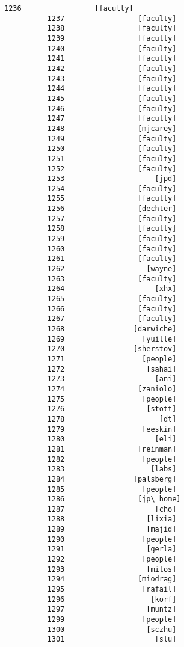 \documentclass[11pt]{article}
\begin{document}
\begin{Verbatim}[commandchars=\\\{\}]
          1236                 [faculty]
          1237                 [faculty]
          1238                 [faculty]
          1239                 [faculty]
          1240                 [faculty]
          1241                 [faculty]
          1242                 [faculty]
          1243                 [faculty]
          1244                 [faculty]
          1245                 [faculty]
          1246                 [faculty]
          1247                 [faculty]
          1248                 [mjcarey]
          1249                 [faculty]
          1250                 [faculty]
          1251                 [faculty]
          1252                 [faculty]
          1253                     [jpd]
          1254                 [faculty]
          1255                 [faculty]
          1256                 [dechter]
          1257                 [faculty]
          1258                 [faculty]
          1259                 [faculty]
          1260                 [faculty]
          1261                 [faculty]
          1262                   [wayne]
          1263                 [faculty]
          1264                     [xhx]
          1265                 [faculty]
          1266                 [faculty]
          1267                 [faculty]
          1268                [darwiche]
          1269                  [yuille]
          1270                [sherstov]
          1271                  [people]
          1272                   [sahai]
          1273                     [ani]
          1274                 [zaniolo]
          1275                  [people]
          1276                   [stott]
          1278                      [dt]
          1279                  [eeskin]
          1280                     [eli]
          1281                 [reinman]
          1282                  [people]
          1283                    [labs]
          1284                [palsberg]
          1285                  [people]
          1286                 [jp\_home]
          1287                     [cho]
          1288                   [lixia]
          1289                   [majid]
          1290                  [people]
          1291                   [gerla]
          1292                  [people]
          1293                   [milos]
          1294                 [miodrag]
          1295                  [rafail]
          1296                    [korf]
          1297                   [muntz]
          1299                  [people]
          1300                   [sczhu]
          1301                     [slu]

\end{Verbatim}
\end{document}
